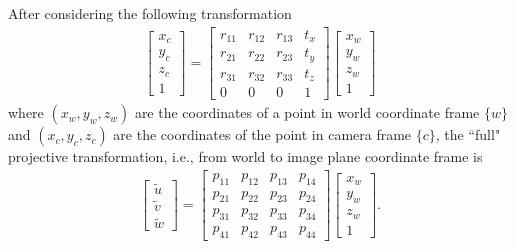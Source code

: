 \documentclass{report}
\begin{document}
After considering the following transformation
\begin{align}
	\begin{bmatrix}
		x_c \\
		y_c \\
		z_c \\
		1
	\end{bmatrix}
	=
	\begin{bmatrix}
		r_{11} & r_{12} & r_{13} & t_x \\
		r_{21} & r_{22} & r_{23} & t_y \\
		r_{31} & r_{32} & r_{33} & t_z \\
		0 & 0 & 0 & 1
	\end{bmatrix}
	\begin{bmatrix}
		x_w \\
		y_w \\
		z_w \\
		1
	\end{bmatrix}
	\label{eqn:WorldToCamera}
\end{align}
where $(x_w, y_w, z_w)$ are the coordinates of a point in world coordinate frame $\{w\}$ and $(x_c, y_c, z_c)$ are the coordinates of the point in camera frame $\{c\}$, the ``full" projective transformation, i.e., from world to image plane coordinate frame is
\begin{align}
	\begin{bmatrix}
		\tilde{u} \\
		\tilde{v} \\
		\tilde{w}
	\end{bmatrix}
	=
	\begin{bmatrix}
		p_{11} & p_{12} & p_{13} & p_{14} \\
		p_{21} & p_{22} & p_{23} & p_{24} \\
		p_{31} & p_{32} & p_{33} & p_{34} \\
		p_{41} & p_{42} & p_{43} & p_{44}
	\end{bmatrix}
	\begin{bmatrix}
		x_w \\
		y_w \\
		z_w \\
		1
	\end{bmatrix}.
	\label{eqn:WorldToImage}
\end{align}


\end{document}
